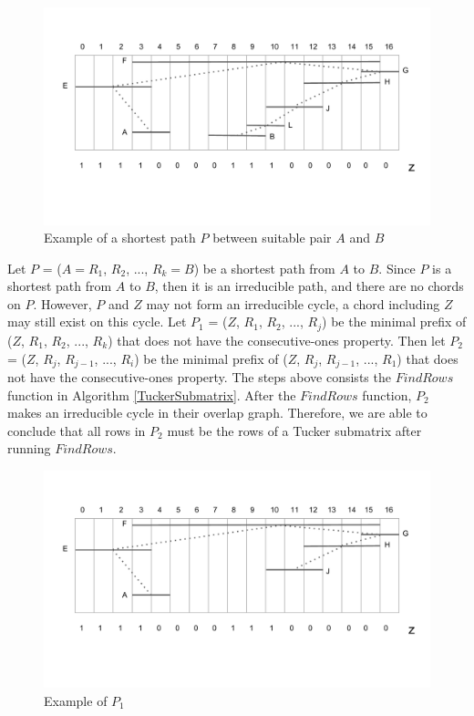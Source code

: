\begin{figure}[H]
\centering
\includegraphics[width=12cm]{figures/lm_3.pdf}
\caption{Example of a shortest path $P$ between suitable pair $A$ and $B$}
\label{lm_3}
\end{figure}

Let $P$ = ($A=R_1$, $R_2$, ..., $R_k=B$) be a shortest path from $A$ to $B$. Since $P$ is a shortest path from $A$ to $B$, then it is an irreducible path, and there are no chords on $P$. However, $P$ and $Z$ may not form an irreducible cycle, a chord including $Z$ may still exist on this cycle. Let $P_1$ = ($Z$, $R_1$, $R_2$, ..., $R_j$) be the minimal prefix of ($Z$, $R_1$, $R_2$, ..., $R_k$) that does not have the consecutive-ones property. Then let $P_2$ = ($Z$, $R_j$, $R_{j-1}$, ..., $R_i$) be the minimal prefix of ($Z$, $R_j$, $R_{j-1}$, ..., $R_1$) that does not have the consecutive-ones property. The steps above consists the $FindRows$ function in Algorithm \ref{TuckerSubmatrix}. After the $FindRows$ function, $P_2$ makes an irreducible cycle in their overlap graph. Therefore, we are able to conclude that all rows in $P_2$ must be the rows of a Tucker submatrix after running $FindRows$.

\begin{figure}[H]
\centering
\includegraphics[width=12cm]{figures/lm_4.pdf}
\caption{Example of $P_1$}
\label{lm_4}
\end{figure}

